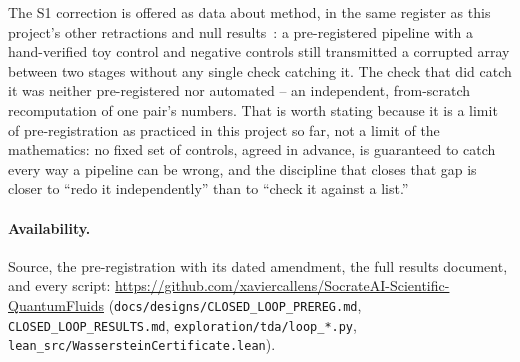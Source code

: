 \documentclass[11pt,a4paper]{article}
\newcommand{\lean}[1]{\texttt{\small #1}}
\begin{document}
The S1 correction is offered as data about method, in the same register as this project's other
retractions and null results~\cite{Callens2026TDA,Callens2026Villani}: a pre-registered pipeline with a
hand-verified toy control and negative controls still transmitted a corrupted array between two stages
without any single check catching it. The check that did catch it was neither pre-registered nor
automated -- an independent, from-scratch recomputation of one pair's numbers. That is worth stating
because it is a limit of pre-registration as practiced in this project so far, not a limit of the
mathematics: no fixed set of controls, agreed in advance, is guaranteed to catch every way a pipeline can
be wrong, and the discipline that closes that gap is closer to ``redo it independently'' than to ``check
it against a list.''

\paragraph{Availability.} Source, the pre-registration with its dated amendment, the full results
document, and every script: \url{https://github.com/xaviercallens/SocrateAI-Scientific-QuantumFluids}
(\texttt{docs/designs/CLOSED\_LOOP\_PREREG.md}, \texttt{CLOSED\_LOOP\_RESULTS.md},
\texttt{exploration/tda/loop\_*.py}, \lean{lean\_src/WassersteinCertificate.lean}).



\end{document}
